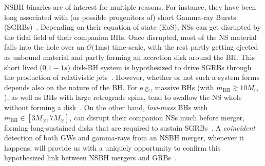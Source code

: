 \documentclass[aps,prd,amsmath,floats,floatfix, twocolumn,
superscriptaddress,nofootinbib,showpacs]{revtex4-1}
\newcommand{\red}{\textcolor{red}}
\newcommand{\prayush}{\textcolor{red!40!black}}
\newcommand{\mbh}{m_\mathrm{BH}}
\begin{document}


% 


NSBH binaries are of interest for multiple reasons. For instance,
they have been long associated with (as possible progenitors of) short
Gamma-ray Bursts (SGRBs)~\cite{eichler:89,1992ApJ...395L..83N,moch:93,Barthelmy:2005bx,
2005Natur.437..845F,2005Natur.437..851G,Shibata:2005mz,Paschalidis2014,
Tanvir:2013}. Depending on their equation of state (EoS), NSs can get disrupted by
the tidal field of their companion BHs. Once disrupted, most of the NS
material falls into the hole over an $\mathcal{O}(1$ms$)$ time-scale,
with the rest partly getting ejected as unbound material
and partly forming an accretion disk around the BH.
% 
This short lived ($0.1-1s$) disk-BH system is hypothesized to drive SGRBs
through the production of relativistic jets~\cite{Foucart:2015a,
Lovelace:2013vma,Deaton2013,Foucart2012,Shibata:2005mz,Paschalidis2014}.
% 
However, whether or not such a system forms depends also on the nature of
the BH. For e.g., massive BHs (with $\mbh\gtrsim 10M_\odot$), as well as BHs with
large retrograde spins, tend to swallow the NS whole without forming a
disk~\cite{Foucart:2013psa}. 
% 
On the other hand, {\it low-mass} BHs with $\mbh\in[3M_\odot, 7M_\odot]$, 
can disrupt their companion NSs much before merger, forming long-sustained disks
that are required to sustain 
SGRBs~\cite{Shibata:2007zm,2010PhRvD..81f4026F,Lovelace:2013vma,Kawaguchi:2015}.
% 
A {\it coincident} detection of both GWs and gamma-rays from an NSBH merger,
whenever it happens, will
provide us with a uniquely opportunity to confirm this hypothesized link between
NSBH mergers and GRBs~\cite{Abbott:2016wya}.
\end{document}

